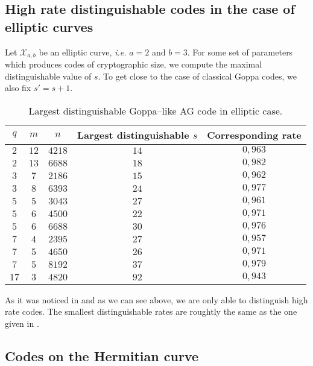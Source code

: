 \documentclass[journal]{IEEEtran}
\theoremstyle{plain}
\theoremstyle{definition}
\theoremstyle{remark}
\newcommand{\calX}{\mathcal{X}}
\begin{document}
	\subsection{High rate distinguishable codes in the case of elliptic curves}
	
	Let $\calX_{a,b}$ be an elliptic curve, \emph{i.e.} $a=2$ and $b=3$. For some set of parameters which produces codes of cryptographic size, we compute the maximal distinguishable value of $s$. To get close to the case of classical Goppa codes, we also fix $s'=s+1$.
	\begin{table}[h]
		\begin{center}
			\caption{Largest distinguishable Goppa--like AG code in elliptic case.}
			\begin{tabular}{|c|c|c||c|c|}
				\hline
				$q$ & $m$ & $n$ & Largest distinguishable $s$ & Corresponding rate\\
				\hline \hline
				$2$ & $12$ & $4218$ & $14$ & $0,963$ \\
				\hline 
				$2$ & $13$ & $6688$ & $18$ & $0,982$  \\
				\hline \hline
				$3$ & $7$ & $2186$ & $15$ & $0,962$ \\
				\hline
				$3$ & $8$ & $6393$ & $24$ & $0,977$ \\
				\hline \hline
				$5$ & $5$ & $3043$ & $27$ & $0,961$  \\
				\hline
				$5$ & $6$ & $4500$ & $22$ & $0,971$ \\
				\hline
				$5$  & $6$ & $6688$ & $30$ & $0,976$ \\
				\hline \hline
				$7$ & $4$ & $2395$ & $27$ & $0,957$ \\
				\hline
				$7$ & $5$ & $4650$ & $26$ & $0,971$ \\
				\hline
				$7$ & $5$ & $8192$ & $37$ & $0,979$ \\
				\hline \hline
				$17$ & $3$ & $4820$ & $92$ & $0,943$ \\
				\hline
			\end{tabular}
		\end{center}
	\end{table}
	
	As it was noticed in \cite{MT21} and as we can see above, we are only able to distinguish high rate codes. The smallest distinguishable rates are roughtly the same as the one given in \cite{MT21}. 
	
	\subsection{Codes on the Hermitian curve}
	
\end{document}
